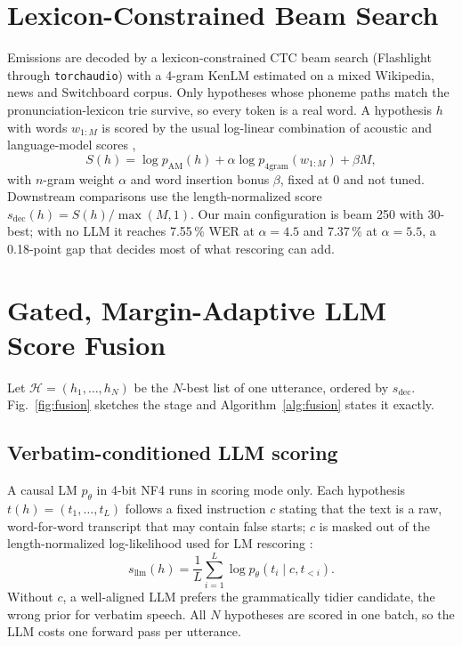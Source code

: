 \documentclass[conference,a4paper,10pt]{IEEEtran}
\newcommand{\pct}{\,\%}
\begin{document}
\section{Lexicon-Constrained Beam Search}\label{sec:beam}
Emissions are decoded by a lexicon-constrained CTC beam search (Flashlight
\cite{kahn2022flashlight} through \texttt{torchaudio}) with a 4-gram KenLM
\cite{heafield2011kenlm} estimated on a mixed Wikipedia, news and Switchboard
corpus. Only hypotheses whose phoneme paths match the pronunciation-lexicon trie
survive, so every token is a real word. A hypothesis $h$ with words $w_{1:M}$ is
scored by the usual log-linear combination of acoustic and language-model scores
\cite{willett2023speech,kannan2018shallow},
\begin{equation}\label{eq:beam}
S(h)=\log p_{\text{AM}}(h)+\alpha\log p_{\text{4gram}}(w_{1:M})+\beta M ,
\end{equation}
with $n$-gram weight $\alpha$ and word insertion bonus $\beta$, fixed at $0$ and
not tuned. Downstream comparisons use the length-normalized score
$s_{\text{dec}}(h)=S(h)/\max(M,1)$. Our main configuration is beam 250 with
30-best; with no LLM it reaches 7.55\pct{} WER at $\alpha=4.5$ and 7.37\pct{}
at $\alpha=5.5$, a 0.18-point gap that decides most of what rescoring can add.

\section{Gated, Margin-Adaptive LLM Score Fusion}\label{sec:fusion}
Let $\mathcal{H}=(h_1,\dots,h_N)$ be the $N$-best list of one utterance, ordered
by $s_{\text{dec}}$. Fig.~\ref{fig:fusion} sketches the stage and
Algorithm~\ref{alg:fusion} states it exactly.

\subsection{Verbatim-conditioned LLM scoring}
A causal LM $p_\theta$ in 4-bit NF4 \cite{dettmers2023qlora} runs in scoring
mode only. Each hypothesis $t(h)=(t_1,\dots,t_L)$ follows a fixed instruction $c$
stating that the text is a raw, word-for-word transcript that may contain false
starts; $c$ is masked out of the length-normalized log-likelihood used for LM
rescoring \cite{salazar2020mlmscoring}:
\begin{equation}\label{eq:llm}
s_{\text{llm}}(h)=\frac{1}{L}\sum_{i=1}^{L}\log p_\theta\!\left(t_i \mid c, t_{<i}\right).
\end{equation}
Without $c$, a well-aligned LLM prefers the grammatically tidier candidate, the
wrong prior for verbatim speech. All $N$ hypotheses are scored in one batch, so
the LLM costs one forward pass per utterance.
\end{document}
